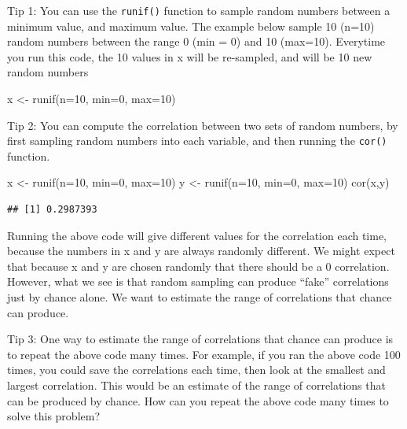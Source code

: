 \documentclass[
]{book}
\newenvironment{Shaded}{\begin{snugshade}}{\end{snugshade}}
\newcommand{\AttributeTok}[1]{\textcolor[rgb]{0.77,0.63,0.00}{#1}}
\newcommand{\DecValTok}[1]{\textcolor[rgb]{0.00,0.00,0.81}{#1}}
\newcommand{\FunctionTok}[1]{\textcolor[rgb]{0.00,0.00,0.00}{#1}}
\newcommand{\NormalTok}[1]{#1}
\newcommand{\OtherTok}[1]{\textcolor[rgb]{0.56,0.35,0.01}{#1}}
\begin{document}
Tip 1: You can use the \texttt{runif()} function to sample random numbers between a minimum value, and maximum value. The example below sample 10 (n=10) random numbers between the range 0 (min = 0) and 10 (max=10). Everytime you run this code, the 10 values in x will be re-sampled, and will be 10 new random numbers

\begin{Shaded}
\begin{Highlighting}[]
\NormalTok{x }\OtherTok{\textless{}{-}} \FunctionTok{runif}\NormalTok{(}\AttributeTok{n=}\DecValTok{10}\NormalTok{, }\AttributeTok{min=}\DecValTok{0}\NormalTok{, }\AttributeTok{max=}\DecValTok{10}\NormalTok{)}
\end{Highlighting}
\end{Shaded}

Tip 2: You can compute the correlation between two sets of random numbers, by first sampling random numbers into each variable, and then running the \texttt{cor()} function.

\begin{Shaded}
\begin{Highlighting}[]
\NormalTok{x }\OtherTok{\textless{}{-}} \FunctionTok{runif}\NormalTok{(}\AttributeTok{n=}\DecValTok{10}\NormalTok{, }\AttributeTok{min=}\DecValTok{0}\NormalTok{, }\AttributeTok{max=}\DecValTok{10}\NormalTok{)}
\NormalTok{y }\OtherTok{\textless{}{-}} \FunctionTok{runif}\NormalTok{(}\AttributeTok{n=}\DecValTok{10}\NormalTok{, }\AttributeTok{min=}\DecValTok{0}\NormalTok{, }\AttributeTok{max=}\DecValTok{10}\NormalTok{)}
\FunctionTok{cor}\NormalTok{(x,y)}
\end{Highlighting}
\end{Shaded}

\begin{verbatim}
## [1] 0.2987393
\end{verbatim}

Running the above code will give different values for the correlation each time, because the numbers in x and y are always randomly different. We might expect that because x and y are chosen randomly that there should be a 0 correlation. However, what we see is that random sampling can produce ``fake'' correlations just by chance alone. We want to estimate the range of correlations that chance can produce.

Tip 3: One way to estimate the range of correlations that chance can produce is to repeat the above code many times. For example, if you ran the above code 100 times, you could save the correlations each time, then look at the smallest and largest correlation. This would be an estimate of the range of correlations that can be produced by chance. How can you repeat the above code many times to solve this problem?
\end{document}
